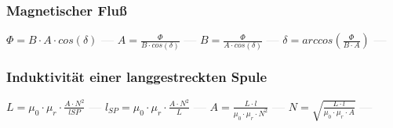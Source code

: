 \subsubsection{Magnetischer Fluß} 
\begin{minipage}{0.45\textwidth} 
\end{minipage} 
\begin{minipage}{0.45\textwidth} 
 
\end{minipage} 
$ \Phi  = B\cdot A\cdot cos(\delta ) $ \textcolor{lightgray}{\textbf{---}} 
$ A = \frac{ \Phi }{B\cdot cos(\delta )} $ \textcolor{lightgray}{\textbf{---}} 
$ B = \frac{ \Phi }{A\cdot cos(\delta )} $ \textcolor{lightgray}{\textbf{---}} 
$ \delta =arccos(\frac{ \Phi }{B\cdot A}) $ \textcolor{lightgray}{\textbf{---}} 

\subsubsection{Induktivität einer langgestreckten Spule} 
\begin{minipage}{0.45\textwidth} 
\end{minipage} 
\begin{minipage}{0.45\textwidth} 
 
\end{minipage} 
$ L = \mu _{0} \cdot \mu _{r} \cdot \frac{A\cdot N^{2} }{lSP} $ \textcolor{lightgray}{\textbf{---}} 
$ l_{SP} = \mu _{0} \cdot \mu _{r} \cdot \frac{A\cdot N^{2} }{L} $ \textcolor{lightgray}{\textbf{---}} 
$ A = \frac{ L\cdot l}{\mu _{0} \cdot \mu _{r} \cdot N^{2} } $ \textcolor{lightgray}{\textbf{---}} 
$ N = \sqrt{\frac{ L\cdot l}{\mu _{0} \cdot \mu _{r} \cdot A}} $ \textcolor{lightgray}{\textbf{---}} 

